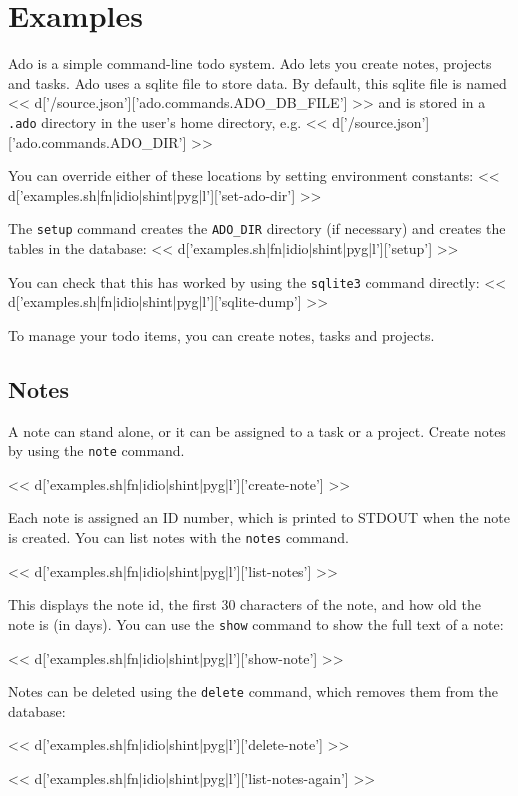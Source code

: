 \documentclass[a4paper]{amsart}
\begin{document}
\section{Examples}

Ado is a simple command-line todo system. Ado lets you create notes,
projects and tasks. Ado uses a sqlite file to store data. By default, this
sqlite file is named << d['/source.json']['ado.commands.ADO_DB_FILE'] >>
and is stored in a \verb|.ado| directory in the user's home directory, e.g.
<< d['/source.json']['ado.commands.ADO_DIR'] >>

You can override either of these locations by setting environment constants:
<< d['examples.sh|fn|idio|shint|pyg|l']['set-ado-dir'] >>

The \verb|setup| command creates the \verb|ADO_DIR| directory (if necessary)
and creates the tables in the database:
<< d['examples.sh|fn|idio|shint|pyg|l']['setup'] >>

You can check that this has worked by using the \verb|sqlite3| command directly:
<< d['examples.sh|fn|idio|shint|pyg|l']['sqlite-dump'] >>

To manage your todo items, you can create notes, tasks and projects.

\subsection{Notes}

A note can stand alone, or it can be assigned to a task or a project. Create
notes by using the \verb|note| command.

<< d['examples.sh|fn|idio|shint|pyg|l']['create-note'] >>

Each note is assigned an ID number, which is printed to STDOUT when the note is
created. You can list notes with the \verb|notes| command.

<< d['examples.sh|fn|idio|shint|pyg|l']['list-notes'] >>

This displays the note id, the first 30 characters of the note, and how old the
note is (in days). You can use the \verb|show| command to show the full text of
a note:

<< d['examples.sh|fn|idio|shint|pyg|l']['show-note'] >>

Notes can be deleted using the \verb|delete| command, which removes them from the database:

<< d['examples.sh|fn|idio|shint|pyg|l']['delete-note'] >>

<< d['examples.sh|fn|idio|shint|pyg|l']['list-notes-again'] >>
\end{document}
